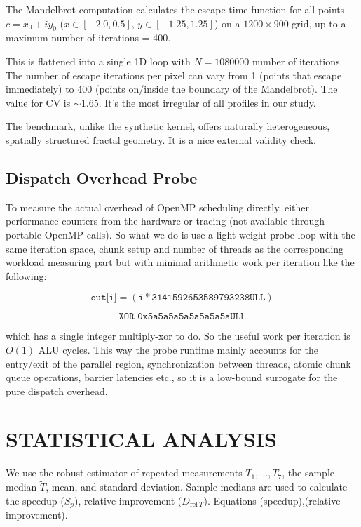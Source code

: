 \documentclass[conference]{IEEEtran}
\begin{document}
The Mandelbrot computation \cite{mandelbrot1980fractal} calculates the escape time function for all points $c = x_0 + i y_0$ ($x \in [-2.0, 0.5]$, $y \in [-1.25, 1.25]$) on a $1200 \times 900$ grid, up to a maximum number of iterations = 400.

This is flattened into a single 1D loop with $N=1080000$ number of iterations. The number of escape iterations per pixel can vary from 1 (points that escape immediately) to 400 (points on/inside the boundary of the Mandelbrot). The value for CV is $\sim 1.65$. It's the most irregular of all profiles in our study.

The benchmark, unlike the synthetic kernel, offers naturally heterogeneous, spatially structured fractal geometry. It is a nice external validity check.

\subsection{Dispatch Overhead Probe}

To measure the actual overhead of OpenMP scheduling directly, either performance counters from the hardware or tracing (not available through portable OpenMP calls). So what we do is use a light-weight probe loop with the same iteration space, chunk setup and number of threads as the corresponding workload measuring part but with minimal arithmetic work per iteration like the following:

\[
\texttt{out[i]} = (\texttt{i} * \texttt{3141592653589793238ULL})
\]

\[
\texttt{XOR 0x5a5a5a5a5a5a5a5aULL}
\]

which has a single integer multiply-xor to do. So the useful work per iteration is $O(1)$ ALU cycles. This way the probe runtime mainly accounts for the entry/exit of the parallel region, synchronization between threads, atomic chunk queue operations, barrier latencies etc., so it is a low-bound surrogate for the pure dispatch overhead.

\section{STATISTICAL ANALYSIS}

We use the robust estimator of repeated measurements $T_1, \ldots, T_7$, the sample median $\tilde{T}$,
mean, and standard deviation. Sample medians are used to calculate the speedup ($S_p$),
relative improvement ($D_{\mathrm{rel}\ T}$). Equations (speedup),(relative improvement).
\end{document}
